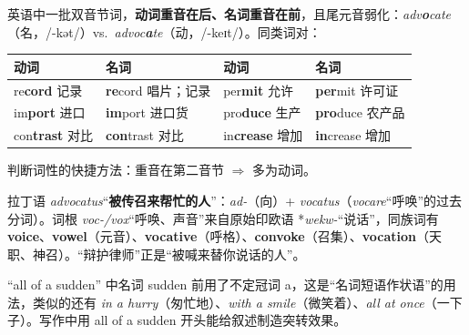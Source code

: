 \documentclass[../main.tex]{subfiles}
\begin{document}

\begin{gram}
英语中一批双音节词，\textbf{动词重音在后、名词重音在前}，且尾元音弱化：\textit{adv\textbf{o}cate}（名，/-kət/）vs.\ \textit{advoc\textbf{a}te}（动，/-keɪt/）。同类词对：
\begin{center}
\begin{tabular}{llll}
\toprule
动词 & 名词 & 动词 & 名词 \\
\midrule
re\textbf{cord} 记录 & \textbf{re}cord 唱片；记录 & per\textbf{mit} 允许 & \textbf{per}mit 许可证 \\
im\textbf{port} 进口 & \textbf{im}port 进口货 & pro\textbf{duce} 生产 & \textbf{pro}duce 农产品 \\
con\textbf{trast} 对比 & \textbf{con}trast 对比 & in\textbf{crease} 增加 & \textbf{in}crease 增加 \\
\bottomrule
\end{tabular}
\end{center}
判断词性的快捷方法：重音在第二音节 $\Rightarrow$ 多为动词。
\end{gram}

\begin{origin}
拉丁语 \textit{advocatus}“\textbf{被传召来帮忙的人}”：\textit{ad-}（向）+ \textit{vocatus}（\textit{vocare}“呼唤”的过去分词）。词根 \textit{voc-/vox}“呼唤、声音”来自原始印欧语 *\textit{wekw-}“说话”，同族词有 \textbf{voice}、\textbf{vowel}（元音）、\textbf{voca\-tive}（呼格）、\textbf{convoke}（召集）、\textbf{vocation}（天职、神召）。“辩护律师”正是“被喊来替你说话的人”。
\end{origin}



\begin{gram}[名词短语作状语]
“all of a sudden” 中名词 sudden 前用了不定冠词 a，这是“名词短语作状语”的用法，类似的还有 \textit{in a hurry}（匆忙地）、\textit{with a smile}（微笑着）、\textit{all at once}（一下子）。写作中用 all of a sudden 开头能给叙述制造突转效果。
\end{gram}


\end{document}
